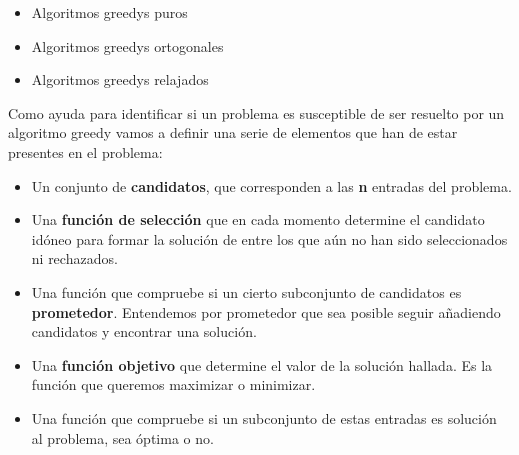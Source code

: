 \begin{itemize}
	\item Algoritmos greedys puros
	\item Algoritmos greedys ortogonales
	\item Algoritmos greedys relajados
\end{itemize}

Como ayuda para identificar si un problema es susceptible de ser resuelto por
un algoritmo greedy vamos a definir una serie de elementos que han de estar
presentes en el problema:

\begin{itemize}
	\item Un conjunto de \textbf{candidatos}, que corresponden a las \textbf{n} entradas del problema.
	\item Una \textbf{función de selección} que en cada momento determine el candidato idóneo
	para formar la solución de entre los que aún no han sido seleccionados ni
rechazados.
	\item Una función que compruebe si un cierto subconjunto de candidatos es
\textbf{prometedor}. Entendemos por prometedor que sea posible seguir añadiendo
candidatos y encontrar una solución.
	\item Una \textbf{función objetivo} que determine el valor de la solución hallada. Es la
	función que queremos maximizar o minimizar.
	\item Una función que compruebe si un subconjunto de estas entradas es solución al
	problema, sea óptima o no.
\end{itemize}